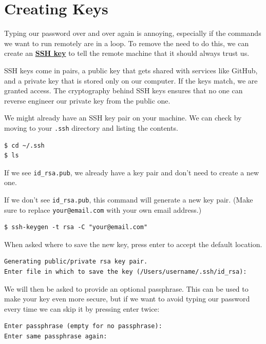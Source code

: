 \documentclass[
]{krantz}
\newcommand{\gref}[2]{\hyperlink{#2}{\textbf{#1}}}
\begin{document}
\hypertarget{ssh-keys}{%
\section{Creating Keys}\label{ssh-keys}}

Typing our password over and over again is annoying,
especially if the commands we want to run remotely are in a loop.
To remove the need to do this,
we can create an \gref{SSH key}{ssh\_key}
to tell the remote machine
that it should always trust us.

SSH keys come in pairs, a public key that gets shared with services like GitHub,
and a private key that is stored only on our computer. If the keys match,
we are granted access.
The cryptography behind SSH keys ensures that no one can reverse engineer our
private key from the public one.

We might already have an SSH key pair on your machine.
We can check by moving to your \texttt{.ssh} directory and listing the contents.

\begin{verbatim}
$ cd ~/.ssh
$ ls
\end{verbatim}

If we see \texttt{id\_rsa.pub},
we already have a key pair and don't need to create a new one.

If we don't see \texttt{id\_rsa.pub},
this command will generate a new key pair.
(Make sure to replace \texttt{your@email.com} with your own email address.)

\begin{verbatim}
$ ssh-keygen -t rsa -C "your@email.com"
\end{verbatim}

When asked where to save the new key,
press enter to accept the default location.

\begin{verbatim}
Generating public/private rsa key pair.
Enter file in which to save the key (/Users/username/.ssh/id_rsa):
\end{verbatim}

We will then be asked to provide an optional passphrase.
This can be used to make your key even more secure,
but if we want to avoid typing our password every time
we can skip it by pressing enter twice:

\begin{verbatim}
Enter passphrase (empty for no passphrase):
Enter same passphrase again:
\end{verbatim}
\end{document}
